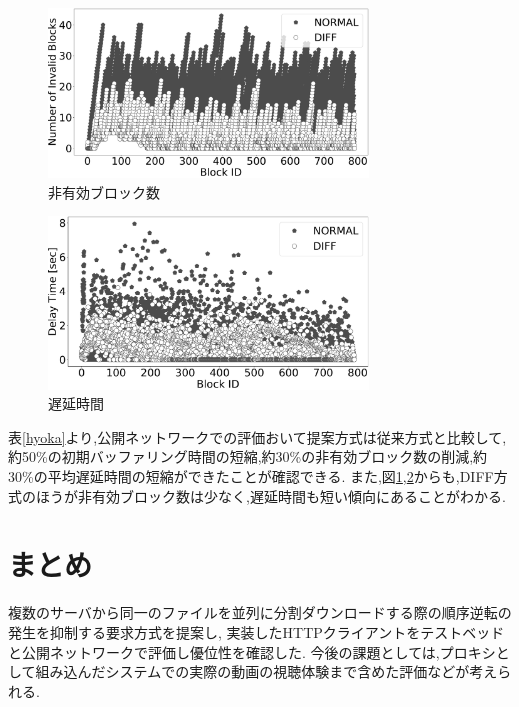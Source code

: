\documentclass{ltjsarticle}
\begin{document}
\begin{figure}[h]
	\centering
	\includegraphics[width=8.5cm]{figure/testNSB.pdf}
	\vspace{-4mm}
	\caption{非有効ブロック数}
	\label{testnsb}
\end{figure}
\vspace{-7.25mm}
\begin{figure}[h]
	\centering
	\includegraphics[width=8.5cm]{figure/testADT.pdf}
	\vspace{-4mm}
	\caption{遅延時間}
	\label{testadt}
\end{figure}
\vspace{-3.75mm}

表\ref{hyoka}より,公開ネットワークでの評価おいて提案方式は従来方式と比較して,
約50\%の初期バッファリング時間の短縮,約30\%の非有効ブロック数の削減,約30\%の平均遅延時間の短縮ができたことが確認できる.
また,図\ref{testnsb},\ref{testadt}からも,DIFF方式のほうが非有効ブロック数は少なく,遅延時間も短い傾向にあることがわかる.
\vspace{-7.5mm}
\section{まとめ}
\vspace{-2.75mm}
複数のサーバから同一のファイルを並列に分割ダウンロードする際の順序逆転の発生を抑制する要求方式を提案し,
実装したHTTPクライアントをテストベッドと公開ネットワークで評価し優位性を確認した.
今後の課題としては,プロキシとして組み込んだシステムでの実際の動画の視聴体験まで含めた評価などが考えられる.
\vspace{-7.25mm}
\fontsize{6pt}{0pt}
\end{document}

